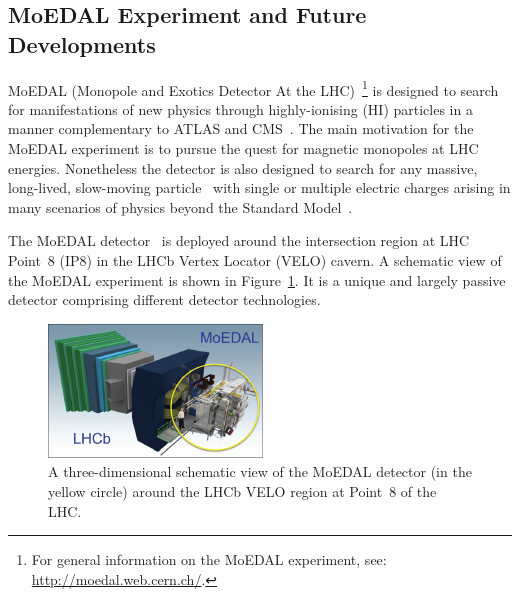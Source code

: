 \subsection{MoEDAL Experiment and Future Developments}
\label{sec:MoEDAL}

MoEDAL (Monopole and Exotics Detector At the LHC)~\cite{Pinfold:1181486}\footnote{For general information on the MoEDAL experiment, see: \url{http://moedal.web.cern.ch/}.} is designed to search for manifestations of new physics through highly-ionising (HI) particles in a manner complementary to ATLAS and CMS~\cite{DeRoeck:2011aa}. The main motivation for the MoEDAL experiment is to pursue the quest for magnetic monopoles at LHC energies. Nonetheless the detector is also designed to search for any massive, long-lived, slow-moving particle~\cite{Fairbairn:2006gg,Burdin:2014xma} with single or multiple electric charges arising in many scenarios of physics beyond the Standard Model~\cite{Acharya:2014nyr}.

The MoEDAL detector~\cite{MoEDAL:2016jlb} is deployed around the intersection region at LHC Point~8 (IP8) in the LHCb Vertex Locator (VELO) cavern. A schematic view of the MoEDAL experiment is shown in Figure~\ref{fg:moedal-lhcb}. It is a unique and largely passive detector comprising different detector technologies.

\begin{figure}[ht]
   \centering
   \includegraphics[width=0.9\linewidth]{plots/moedal-detector.pdf}
   \caption{A three-dimensional schematic view of the MoEDAL detector (in the yellow circle) around the LHCb VELO region at Point~8 of the LHC.}
   \label{fg:moedal-lhcb}
\end{figure}


